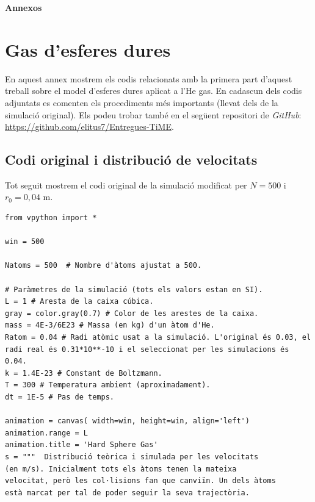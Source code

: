 \documentclass[a4paper,10.5pt]{report}
\begin{document}
\begin{appendices}
	
	\textbf{\Huge{Annexos}}
	\renewcommand{\thesection}{\Alph{section}} %
	\renewcommand{\theequation}{\thesection.\arabic{equation}} %
	\setcounter{equation}{0} %
	
	\section{Gas d'esferes dures}
	\label{annex:1}
	En aquest annex mostrem els codis relacionats amb la primera part d'aquest treball sobre el model d'esferes dures aplicat a l'He gas. En cadascun dels codis adjuntats es comenten els procediments més importants (llevat dels de la simulació original). Els podeu trobar també en el següent repositori de \textit{GitHub}: \url{https://github.com/elitus7/Entregues-TiME}.
	
	\subsection{Codi original i distribució de velocitats}
	\label{annex:a1}
	Tot seguit mostrem el codi original de la simulació modificat per $N = 500$ i $r_0 = 0,04$ m.
	
	\begin{lstlisting}[caption={Simulació de la distribució de velocitats per $N = 500$ i $r_0 = 0,04$ m.}]
from vpython import *

win = 500

Natoms = 500  # Nombre d'àtoms ajustat a 500.

# Paràmetres de la simulació (tots els valors estan en SI).
L = 1 # Aresta de la caixa cúbica.
gray = color.gray(0.7) # Color de les arestes de la caixa.
mass = 4E-3/6E23 # Massa (en kg) d'un àtom d'He.
Ratom = 0.04 # Radi atòmic usat a la simulació. L'original és 0.03, el radi real és 0.31*10**-10 i el seleccionat per les simulacions és 0.04.
k = 1.4E-23 # Constant de Boltzmann.
T = 300 # Temperatura ambient (aproximadament).
dt = 1E-5 # Pas de temps.

animation = canvas( width=win, height=win, align='left')
animation.range = L
animation.title = 'Hard Sphere Gas'
s = """  Distribució teòrica i simulada per les velocitats
(en m/s). Inicialment tots els àtoms tenen la mateixa
velocitat, però les col·lisions fan que canviïn. Un dels àtoms
està marcat per tal de poder seguir la seva trajectòria.


\end{lstlisting}
\end{appendices}
\end{document}
